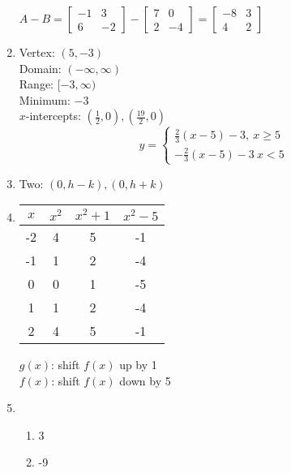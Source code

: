 \documentclass{article}
\begin{document}
\begin{enumerate}
	$A - B =
	\begin{bmatrix}
	-1 & 3 \\
	6 & -2
	\end{bmatrix} -
	\begin{bmatrix}
	7 & 0 \\
	2 & -4
	\end{bmatrix} =
	\begin{bmatrix}
	-8 & 3 \\
	4 & 2
	\end{bmatrix}$
	
\item Vertex: $(5, -3)$ \\
	Domain: $(-\infty, \infty)$ \\
	Range: $[-3, \infty)$ \\
	Minimum: $-3$ \\
	$x$-intercepts: $(\frac{1}{2}, 0), (\frac{19}{2}, 0)$ \\
	
	\begin{equation*}
	y = \begin{cases}
	\frac{2}{3} (x - 5) - 3, \ x \geq 5 \\
	-\frac{2}{3} (x - 5) - 3 \ x < 5
	\end{cases}
	\end{equation*}
	
\item Two: $(0, h-k), (0, h + k)$

\item 
	\begin{tabular}{c | c | c | c}
	$x$ & $x^2$ & $x^2 + 1$ & $x^2 - 5$ \\
	\hline
	-2 & 4 & 5 & -1 \\
	-1 & 1 & 2 & -4 \\
	0 & 0 & 1 & -5 \\
	1 & 1 & 2 & -4 \\
	2 & 4 & 5 & -1
	\end{tabular}
	
	$g(x)$: shift $f(x)$ up by 1 \\
	$f(x)$: shift $f(x)$ down by 5
	
\item
	\begin{enumerate}
	
	\item 3
	
	\item -9
	
	\end{enumerate}
	

\end{enumerate}
\end{document}
